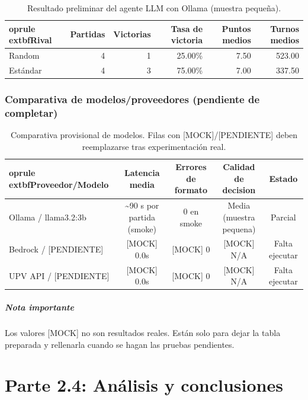 \documentclass[11pt,spanish,listoffigures,listoftables]{tfgetsinf}
\begin{document}
\begin{table}[H]
\centering
\small
\begin{tabular}{lrrrrr}
	oprule
	extbf{Rival} & \textbf{Partidas} & \textbf{Victorias} & \textbf{Tasa de victoria} & \textbf{Puntos medios} & \textbf{Turnos medios} \\
\midrule
Random & 4 & 1 & 25.00\% & 7.50 & 523.00 \\
Estándar & 4 & 3 & 75.00\% & 7.00 & 337.50 \\
\bottomrule
\end{tabular}
\caption{Resultado preliminar del agente LLM con Ollama (muestra pequeña).}
\label{tab:llm_smoke_results}
\end{table}

\subsection{Comparativa de modelos/proveedores (pendiente de completar)}
\begin{table}[H]
\centering
\small
\begin{tabular}{lcccc}
	oprule
	extbf{Proveedor/Modelo} & \textbf{Latencia media} & \textbf{Errores de formato} & \textbf{Calidad de decision} & \textbf{Estado} \\
\midrule
Ollama / llama3.2:3b & \textasciitilde 90 s por partida (smoke) & 0 en smoke & Media (muestra pequena) & Parcial \\
Bedrock / [PENDIENTE] & [MOCK] 0.0s & [MOCK] 0 & [MOCK] N/A & Falta ejecutar \\
UPV API / [PENDIENTE] & [MOCK] 0.0s & [MOCK] 0 & [MOCK] N/A & Falta ejecutar \\
\bottomrule
\end{tabular}
\caption{Comparativa provisional de modelos. Filas con [MOCK]/[PENDIENTE] deben reemplazarse tras experimentación real.}
\label{tab:llm_model_comparison}
\end{table}

\paragraph{Nota importante}
Los valores [MOCK] no son resultados reales. Están solo para dejar la tabla preparada y rellenarla cuando se hagan las pruebas pendientes.

\chapter{Parte 2.4: Análisis y conclusiones}
\end{document}
